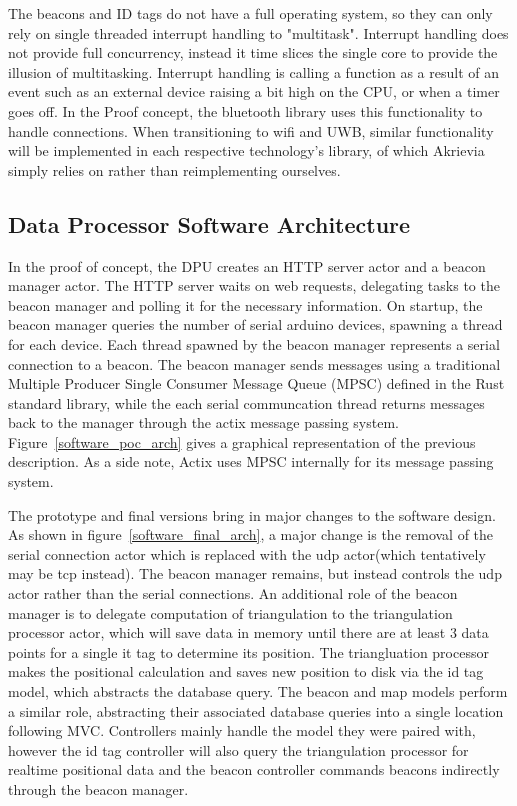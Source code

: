 The beacons and ID tags do not have a full operating system, so they can only rely on single threaded interrupt handling to "multitask".
Interrupt handling does not provide full concurrency, instead it time slices the single core to provide the illusion of multitasking.
Interrupt handling is calling a function as a result of an event such as an external device raising a bit high on the CPU, or when a timer goes off.
In the Proof concept, the bluetooth library uses this functionality to handle connections.
When transitioning to wifi and UWB, similar functionality will be implemented in each respective technology's library, of which Akrievia simply relies on rather than reimplementing ourselves.

\bigskip
\subsection{Data Processor Software Architecture}
In the proof of concept, the DPU creates an HTTP server actor and a beacon manager actor.
The HTTP server waits on web requests, delegating tasks to the beacon manager and polling it for the necessary information.
On startup, the beacon manager queries the number of serial arduino devices, spawning a thread for each device.
Each thread spawned by the beacon manager represents a serial connection to a beacon.
The beacon manager sends messages using a traditional Multiple Producer Single Consumer Message Queue (MPSC) defined in the Rust standard library, while the each serial communcation thread returns messages back to the manager through the actix message passing system.
Figure~\ref{software_poc_arch} gives a graphical representation of the previous description.
As a side note, Actix uses MPSC internally for its message passing system.

\bigskip
The prototype and final versions bring in major changes to the software design.
As shown in figure~\ref{software_final_arch}, a major change is the removal of the serial connection actor which is replaced with the udp actor(which tentatively may be tcp instead).
The beacon manager remains, but instead controls the udp actor rather than the serial connections.
An additional role of the beacon manager is to delegate computation of triangulation to the triangulation processor actor, which will save data in memory until there are at least 3 data points for a single it tag to determine its position.
The triangluation processor makes the positional calculation and saves new position to disk via the id tag model, which abstracts the database query.
The beacon and map models perform a similar role, abstracting their associated database queries into a single location following MVC.
Controllers mainly handle the model they were paired with, however the id tag controller will also query the triangulation processor for realtime positional data and the beacon controller commands beacons indirectly through the beacon manager.

